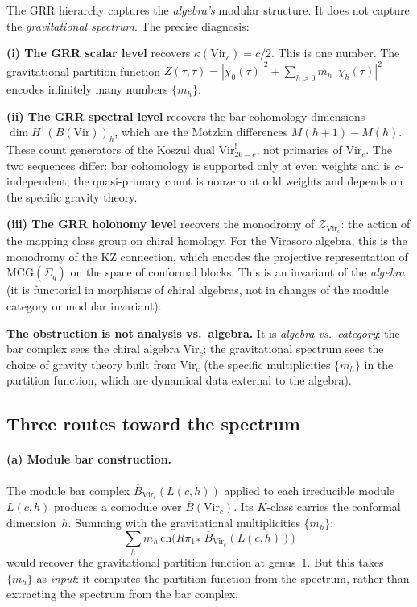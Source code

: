 \documentclass[11pt]{article}
\newcommand{\cZ}{\mathcal{Z}}
\newcommand{\barB}{\overline{B}}
\begin{document}
The GRR hierarchy captures the \emph{algebra's} modular
structure.  It does not capture the \emph{gravitational
spectrum}.  The precise diagnosis:

\textbf{(i) The GRR scalar level} recovers $\kappa(\mathrm{Vir}_c)
= c/2$.  This is one number.  The gravitational partition function
$Z(\tau,\bar\tau) = |\chi_0(\tau)|^2 + \sum_{h > 0} m_h\,
|\chi_h(\tau)|^2$ encodes infinitely many numbers $\{m_h\}$.

\textbf{(ii) The GRR spectral level} recovers the bar cohomology
dimensions $\dim H^1(B(\mathrm{Vir}))_h$, which are the Motzkin
differences $M(h+1) - M(h)$.  These count generators of the
Koszul dual $\mathrm{Vir}^!_{26-c}$, not primaries of
$\mathrm{Vir}_c$.  The two sequences differ: bar cohomology is
supported only at even weights and is $c$-independent; the
quasi-primary count is nonzero at odd weights and depends on the
specific gravity theory.

\textbf{(iii) The GRR holonomy level} recovers the monodromy of
$\cZ_{\mathrm{Vir}_c}$: the action of the mapping class group on
chiral homology.  For the Virasoro algebra, this is the
monodromy of the KZ connection, which encodes the
projective representation of $\mathrm{MCG}(\Sigma_g)$ on the
space of conformal blocks.  This is an invariant of the
\emph{algebra} (it is functorial in morphisms of chiral algebras,
not in changes of the module category or modular invariant).

\textbf{The obstruction is not analysis vs.\ algebra.}
It is \emph{algebra vs.\ category}: the bar complex sees
the chiral algebra $\mathrm{Vir}_c$; the gravitational
spectrum sees the choice of gravity theory built from
$\mathrm{Vir}_c$ (the specific multiplicities $\{m_h\}$
in the partition function, which are dynamical data external
to the algebra).

\subsection{Three routes toward the spectrum}

\paragraph{(a) Module bar construction.}
The module bar complex $\barB_{\mathrm{Vir}_c}(L(c,h))$ applied
to each irreducible module $L(c,h)$ produces a comodule over
$\barB(\mathrm{Vir}_c)$.  Its $K$-class carries the conformal
dimension~$h$.  Summing with the gravitational multiplicities
$\{m_h\}$:
\[
\sum_{h} m_h\,\mathrm{ch}\bigl(
R\pi_{1*}\,\barB_{\mathrm{Vir}_c}(L(c,h))\bigr)
\]
would recover the gravitational partition function at genus~$1$.
But this takes $\{m_h\}$ as \emph{input}: it computes the
partition function from the spectrum, rather than extracting
the spectrum from the bar complex.
\end{document}

